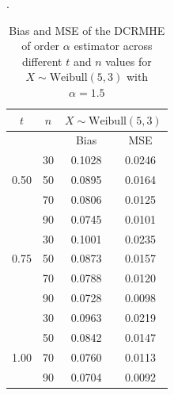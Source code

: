 \documentclass[11pt,reqno]{amsart}
\theoremstyle{tight}
\begin{document}
\begin{table}[h!]
\centering
\caption{Bias and MSE of the DCRMHE of order $\alpha$ estimator across different $t$ and $n$ values for ${X \sim \text{Weibull}(5,3)}$ with $\alpha=1.5$}.
    \label{DCRMHE alpha=1.5}
\begin{tabular}{|c|c|cc|}
\toprule
$t$ & $n$ & \multicolumn{2}{c|}{$X \sim \text{Weibull}(5,3)$ } \\
\midrule
&  &Bias & MSE \\
\midrule
     &30 &0.1028 &0.0246\\
0.50      &50 &0.0895 &0.0164 \\
 &70 &0.0806 &0.0125 \\
     &90 &0.0745&0.0101 \\

     \midrule
     &30 &0.1001 &0.0235 \\
 0.75    &50 &0.0873 &0.0157 \\
 &70 &0.0788 &0.0120\\
     &90 &0.0728 &0.0098 \\

     \midrule
     &30 &0.0963 &0.0219 \\
     &50 &0.0842 &0.0147 \\
1.00 &70 &0.0760&0.0113 \\
     &90 &0.0704&0.0092\\

     \bottomrule
\end{tabular}
\end{table}
\end{document}
